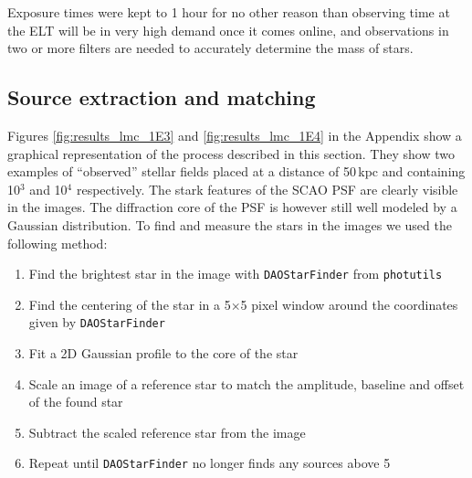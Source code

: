 Exposure times were kept to 1 hour for no other reason than observing time at the ELT will be in very high demand once it comes online, and observations in two or more filters are needed to accurately determine the mass of stars.


\subsection{Source extraction and matching}
Figures \ref{fig:results_lmc_1E3} and \ref{fig:results_lmc_1E4} in the Appendix show a graphical representation of the process described in this section. They show two examples of ``observed'' stellar fields placed at a distance of 50\,kpc and containing 10$^3$ and 10$^4$ \spa respectively. The stark features of the SCAO PSF
are clearly visible in the images. The diffraction core of the PSF is however still well modeled by a Gaussian distribution.
To find and measure the stars in the images we used the following method:

\begin{enumerate}
    \item Find the brightest star in the image with \verb+DAOStarFinder+ from \verb+photutils+ \citep{photutils}
    \item Find the centering of the star in a 5$\times$5 pixel window around the coordinates given by \verb+DAOStarFinder+
    \item Fit a 2D Gaussian profile to the core of the star
    \item Scale an image of a reference star to match the amplitude, baseline and offset of the found star
    \item Subtract the scaled reference star from the image
    \item Repeat until \verb+DAOStarFinder+ no longer finds any sources above 5\,\sig
\end{enumerate}

